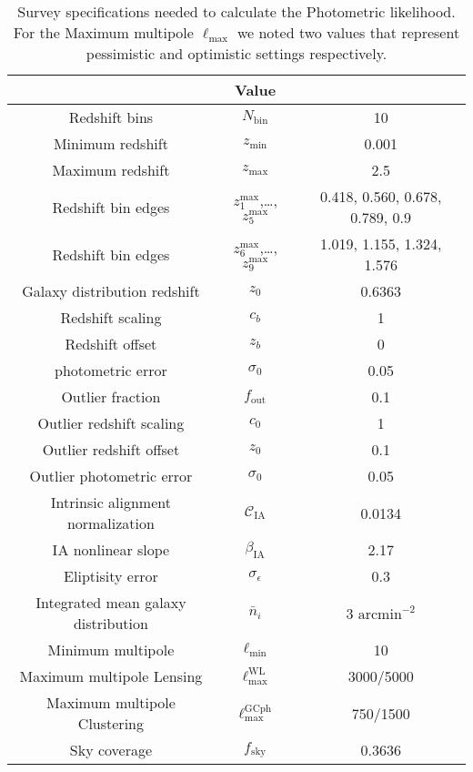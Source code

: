 \documentclass[../main.tex]{subfiles}
\begin{document}
\begin{table}
    \centering
    \begin{tabular}{cc|c}
    \hline
    \rowcolor{cyan}\multicolumn{2}{c|}{Survey Spec }& Value \\
    \hline
    Redshift bins & $N_\mathrm{bin}$ & 10\\
    Minimum redshift& $z_\mathrm{min}$ & 0.001\\
    Maximum redshift& $z_\mathrm{max}$ & 2.5\\
    Redshift bin edges& $z_1^\mathrm{max}$,…, $z_5^\mathrm{max}$ & 0.418, 0.560, 0.678, 0.789, 0.9\\
    Redshift bin edges& $z_6^\mathrm{max}$,…, $z_9^\mathrm{max}$ & 1.019, 1.155, 1.324, 1.576\\
    Galaxy distribution redshift& $z_0$ & 0.6363\\
    Redshift scaling & $c_b$ & 1\\
    Redshift offset &$z_b$& 0\\
    photometric error & $\sigma_0$ & 0.05\\
    Outlier fraction &$f_\mathrm{out}$& 0.1\\
    Outlier redshift scaling& $c_0$ & 1\\
    Outlier redshift offset & $z_0$ & 0.1\\
    Outlier photometric error &$\sigma_0$& 0.05\\
    Intrinsic alignment normalization& $\mathcal{C}_\mathrm{IA}$ & 0.0134\\
    IA nonlinear slope& $\beta_\mathrm{IA}$ & 2.17\\
    Eliptisity error& $\sigma_\epsilon$& 0.3\\
    Integrated mean galaxy distribution& $\bar{n}_i$ &3 $\mathrm{arcmin}^{-2}$\\
    Minimum multipole& $\ell_\mathrm{min}$& 10\\
    Maximum multipole Lensing& $\ell_\mathrm{max}^\mathrm{WL}$ &3000/5000\\
    Maximum multipole Clustering&$\ell_\mathrm{max}^\mathrm{GCph}$ &750/1500\\
    Sky coverage &$f_\mathrm{sky}$ & 0.3636
    \end{tabular}
    \caption{Survey specifications needed to calculate the Photometric likelihood. For the Maximum multipole $\ell_\mathrm{max}$ we noted two values that represent pessimistic and optimistic settings respectively.}
    \label{tab:survey_spec_photo}
\end{table}
\end{document}
